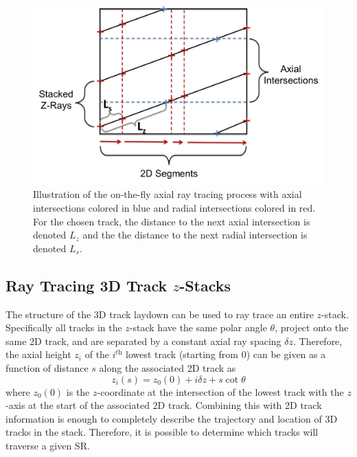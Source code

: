 \begin{figure}[ht!]
	\centering
	\includegraphics[width=0.75\linewidth]{figures/ph2016/otf_ray_tracing.png}
	\caption{Illustration of the on-the-fly axial ray tracing process with axial intersections colored in blue and radial intersections colored in red. For the chosen track, the distance to the next axial intersection is denoted $L_z$ and the the distance to the next radial intersection is denoted $L_s$.}
	\label{fig::otf_ray_tracing}
\end{figure}

\subsection{Ray Tracing 3D Track $z$-Stacks}

The structure of the 3D track laydown can be used to ray trace an entire $z$-stack. Specifically all tracks in the $z$-stack have the same polar angle $\theta$, project onto the same 2D track, and are separated by a constant axial ray spacing $\delta z$. Therefore, the axial height $z_i$ of the $i^{\textit{th}}$ lowest track (starting from 0) can be given as a function of distance $s$ along the associated 2D track as
\begin{equation}
z_i(s) = z_0(0) + i\delta z + s \cot{\theta}
\label{eq::track_projection}
\end{equation}
where $z_0(0)$ is the $z$-coordinate at the intersection of the lowest track with the $z$-axis at the start of the associated 2D track. Combining this with 2D track information is enough to completely describe the trajectory and location of 3D tracks in the stack. Therefore, it is possible to determine which tracks will traverse a given \ac{SR}.

